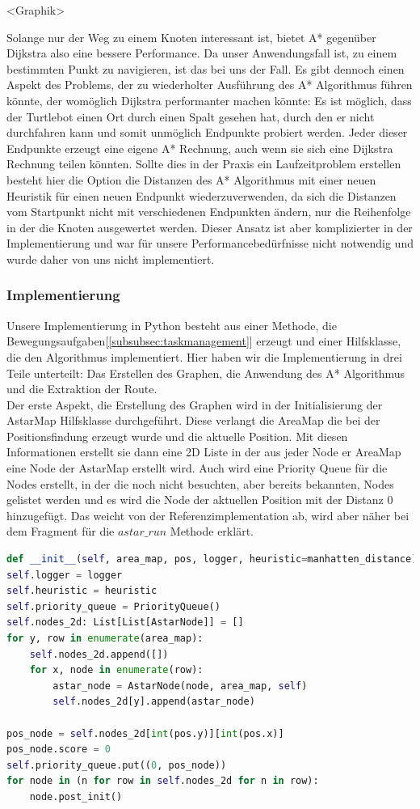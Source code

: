 <Graphik> %

Solange nur der Weg zu einem Knoten interessant ist, bietet A* gegenüber Dijkstra also eine bessere Performance.
Da unser Anwendungsfall ist, zu einem bestimmten Punkt zu navigieren, ist das bei uns der Fall.
Es gibt dennoch einen Aspekt des Problems, der zu wiederholter Ausführung des A* Algorithmus führen könnte, der womöglich
Dijkstra performanter machen könnte: Es ist möglich, dass der Turtlebot einen Ort durch einen Spalt gesehen hat, durch
den er nicht durchfahren kann und somit unmöglich Endpunkte probiert werden.
Jeder dieser Endpunkte erzeugt eine eigene A* Rechnung, auch wenn sie sich eine Dijkstra Rechnung teilen könnten.
Sollte dies in der Praxis ein Laufzeitproblem erstellen besteht hier die Option die Distanzen des A* Algorithmus mit
einer neuen Heuristik für einen neuen Endpunkt wiederzuverwenden, da sich die Distanzen vom Startpunkt nicht mit
verschiedenen Endpunkten ändern, nur die Reihenfolge in der die Knoten ausgewertet werden.
Dieser Ansatz ist aber komplizierter in der Implementierung und war für unsere Performancebedürfnisse nicht notwendig und
wurde daher von uns nicht implementiert.
\subsubsection{Implementierung}
Unsere Implementierung in Python besteht aus einer Methode, die Bewegungsaufgaben[\ref{subsubsec:taskmanagement}] erzeugt
und einer Hilfsklasse, die den Algorithmus implementiert.
Hier haben wir die Implementierung in drei Teile unterteilt: Das Erstellen des Graphen, die Anwendung des A* Algorithmus
und die Extraktion der Route.\\

Der erste Aspekt, die Erstellung des Graphen wird in der Initialisierung der AstarMap Hilfsklasse durchgeführt.
Diese verlangt die AreaMap die bei der Positionsfindung erzeugt wurde und die aktuelle Position.
Mit diesen Informationen erstellt sie dann eine 2D Liste in der aus jeder Node er AreaMap eine Node der AstarMap erstellt
wird.
Auch wird eine Priority Queue für die Nodes erstellt, in der die noch nicht besuchten, aber bereits bekannten, Nodes gelistet
werden und es wird die Node der aktuellen Position mit der Distanz 0 hinzugefügt.
Das weicht von der Referenzimplementation ab, wird aber näher bei dem Fragment für die $astar\_run$ Methode erklärt.
\begin{lstlisting}[language=python,label={lst:astar_map_init}]
def __init__(self, area_map, pos, logger, heuristic=manhatten_distance):
self.logger = logger
self.heuristic = heuristic
self.priority_queue = PriorityQueue()
self.nodes_2d: List[List[AstarNode]] = []
for y, row in enumerate(area_map):
    self.nodes_2d.append([])
    for x, node in enumerate(row):
        astar_node = AstarNode(node, area_map, self)
        self.nodes_2d[y].append(astar_node)

pos_node = self.nodes_2d[int(pos.y)][int(pos.x)]
pos_node.score = 0
self.priority_queue.put((0, pos_node))
for node in (n for row in self.nodes_2d for n in row):
    node.post_init()
\end{lstlisting}

